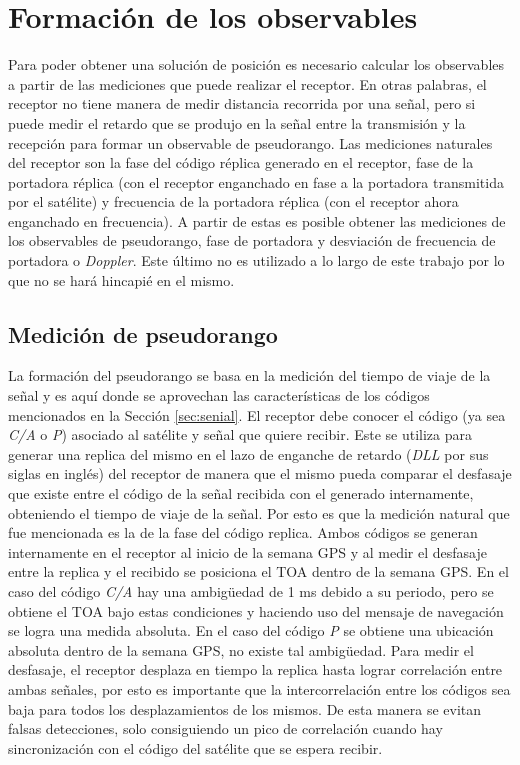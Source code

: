 \documentclass[a4paper,12pt,oneside,onecolumn,final,openright]{book}%
\begin{document}
\section{Formación de los observables}\label{sec:observables}
	  Para poder obtener una solución de posición es necesario calcular los observables a partir de las mediciones que puede realizar el receptor. En otras palabras, el receptor no tiene manera de medir distancia recorrida por una señal, pero si puede medir el retardo que se produjo en la señal entre la transmisión y la recepción para formar un observable de pseudorango. Las mediciones naturales del receptor son la fase del código réplica generado en el receptor, fase de la portadora réplica (con el receptor enganchado en fase a la portadora transmitida por el satélite) y frecuencia de la portadora réplica (con el receptor ahora enganchado en frecuencia). A partir de estas es posible obtener las mediciones de los observables de pseudorango, fase de portadora y desviación de frecuencia de portadora o \textit{Doppler}. Este último no es utilizado a lo largo de este trabajo por lo que no se hará hincapié en el mismo.
	
\subsection{Medición de pseudorango}
	La formación del pseudorango se basa en la medición del tiempo de viaje de la señal y es aquí donde se aprovechan las características de los códigos mencionados en la Sección \ref{sec:senial}. El receptor debe conocer el código (ya sea \textit{C/A} o \textit{P}) asociado al satélite y señal que quiere recibir. Este se utiliza para generar una replica del mismo en el lazo de enganche de retardo (\textit{DLL} por sus siglas en inglés) del receptor de manera que el mismo pueda comparar el desfasaje que existe entre el código de la señal recibida con el generado internamente, obteniendo el tiempo de viaje de la señal. Por esto es que la medición natural que fue mencionada es la de la fase del código replica. Ambos códigos se generan internamente en el receptor al inicio de la semana GPS y al medir el desfasaje entre la replica y el recibido se posiciona el TOA dentro de la semana GPS. En el caso del código \textit{C/A} hay una ambigüedad de 1 ms debido a su periodo, pero se obtiene el TOA bajo estas condiciones y haciendo uso del mensaje de navegación se logra una medida absoluta. En el caso del código \textit{P} se obtiene una ubicación absoluta dentro de la semana GPS, no existe tal ambigüedad. Para medir el desfasaje, el receptor desplaza en tiempo la replica hasta lograr correlación entre ambas señales, por esto es importante que la intercorrelación entre los códigos sea baja para todos los desplazamientos de los mismos. De esta manera se evitan falsas detecciones, solo consiguiendo un pico de correlación cuando hay sincronización con el código del satélite que se espera recibir.
	
\end{document}
